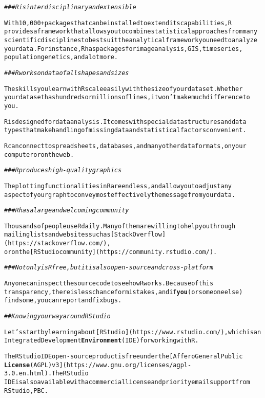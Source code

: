 \documentclass{article}\usepackage[]{graphicx}\usepackage[]{xcolor}
\makeatletter
\newcommand{\hlcom}[1]{\textcolor[rgb]{0.678,0.584,0.686}{\textit{#1}}}%
\newcommand{\hlkwd}[1]{\textcolor[rgb]{0.737,0.353,0.396}{\textbf{#1}}}%
\newenvironment{kframe}{%
 \def\at@end@of@kframe{}%
 \ifinner\ifhmode%
  \def\at@end@of@kframe{\end{minipage}}%
  \begin{minipage}{\columnwidth}%
 \fi\fi%
 \def\FrameCommand##1{\hskip\@totalleftmargin \hskip-\fboxsep
 \colorbox{shadecolor}{##1}\hskip-\fboxsep
     \hskip-\linewidth \hskip-\@totalleftmargin \hskip\columnwidth}%
 \MakeFramed {\advance\hsize-\width
   \@totalleftmargin\z@ \linewidth\hsize
   \@setminipage}}%
 {\par\unskip\endMakeFramed%
 \at@end@of@kframe}
\newenvironment{knitrout}{}{} %
\makeatother
\begin{document}
\begin{knitrout}
\begin{kframe}
\begin{alltt}
\hlcom{### R is interdisciplinary and extensible}

With 10,000+ packages that can be installed to extend its capabilities, R
provides a framework that allows you to combine statistical approaches from many
scientific disciplines to best suit the analytical framework you need to analyze
your data. For instance, R has packages for image analysis, GIS, time series,
population genetics, and a lot more.

\hlcom{### R works on data of all shapes and sizes}

The skills you learn with R scale easily with the size of your dataset. Whether
your dataset has hundreds or millions of lines, it won't make much difference to
you.

R is designed for data analysis. It comes with special data structures and data
types that make handling of missing data and statistical factors convenient.

R can connect to spreadsheets, databases, and many other data formats, on your
computer or on the web.

\hlcom{### R produces high-quality graphics}

The plotting functionalities in R are endless, and allow you to adjust any
aspect of your graph to convey most effectively the message from your data.

\hlcom{### R has a large and welcoming community}

Thousands of people use R daily. Many of them are willing to help you through
mailing lists and websites such as [Stack Overflow](https://stackoverflow.com/),
or on the [RStudio community](https://community.rstudio.com/).

\hlcom{### Not only is R free, but it is also open-source and cross-platform}

Anyone can inspect the source code to see how R works. Because of this
transparency, there is less chance for mistakes, and if \hlkwd{you} (or someone else)
find some, you can report and fix bugs.

\hlcom{## Knowing your way around RStudio}

Let's start by learning about [RStudio](https://www.rstudio.com/), which is an
Integrated Development \hlkwd{Environment} (IDE) for working with R.

The RStudio IDE open-source product is free under the [Affero General Public
\hlkwd{License} (AGPL) v3](https://www.gnu.org/licenses/agpl-3.0.en.html). The RStudio
IDE is also available with a commercial license and priority email support from
RStudio, PBC.


\end{alltt}
\end{kframe}
\end{knitrout}
\end{document}
